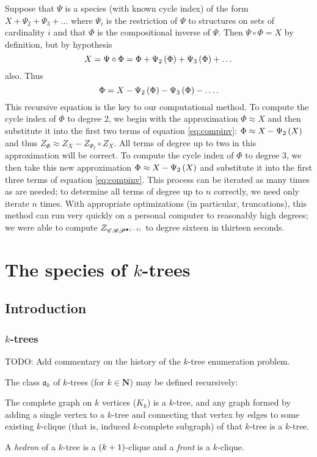 \documentclass[sectionflow,singlespace,twoside]{brandiss} %
\numberwithin{section}{chapter}
\numberwithin{figure}{chapter}
\begin{document}
Suppose that $\Psi$ is a species (with known cycle index) of the form $X + \Psi_{2} + \Psi_{3} + \dots$ where $\Psi_{i}$ is the restriction of $\Psi$ to structures on sets of cardinality $i$ and that $\Phi$ is the compositional inverse of $\Psi$.
Then $\Psi \circ \Phi = X$ by definition, but by hypothesis
\begin{equation*}
  X = \Psi \circ \Phi = \Phi + \Psi_{2} \left( {\Phi} \right) + \Psi_{3} \left( {\Phi} \right) + \dots
\end{equation*}
also. Thus
\begin{equation}
  \label{eq:compinv}
  \Phi = X - \Psi_{2} \left( {\Phi} \right) - \Psi_{3} \left( {\Phi} \right) - \dots.
\end{equation}
This recursive equation is the key to our computational method.
To compute the cycle index of $\Phi$ to degree $2$, we begin with the approximation $\Phi \approx X$ and then substitute it into the first two terms of equation \eqref{eq:compinv}: $\Phi \approx X - \Psi_{2} \left( {X} \right)$ and thus $Z_{\Phi} \approx Z_{X} - Z_{\Psi_{2}} \circ Z_{X}$.
All terms of degree up to two in this approximation will be correct.
To compute the cycle index of $\Phi$ to degree $3$, we then take this new approximation $\Phi \approx X - \Psi_{2} \left( {X} \right)$ and substitute it into the first three terms of equation \eqref{eq:compinv}.
This process can be iterated as many times as are needed; to determine all terms of degree up to $n$ correctly, we need only iterate $n$ times.
With appropriate optimizations (in particular, truncations), this method can run very quickly on a personal computer to reasonably high degrees; we were able to compute $Z_{\mathscr{CBP}^{\bullet \left\langle {-1} \right\rangle}}$ to degree sixteen in thirteen seconds.

\chapter{The species of $k$-trees}\label{c:ktrees}
\section{Introduction}\label{s:intro}
\subsection{$k$-trees}\label{ss:ktrees}
TODO: Add commentary on the history of the $k$-tree enumeration problem.

The class $\mathfrak{a}_{k}$ of $k$-trees (for $k \in \mathbf{N}$) may be defined recursively:
\begin{definition}
  \label{def:ktree}
  The complete graph on $k$ vertices ($K_{k}$) is a $k$-tree, and any graph formed by adding a single vertex to a $k$-tree and connecting that vertex by edges to some existing $k$-clique (that is, induced $k$-complete subgraph) of that $k$-tree is a $k$-tree.
\end{definition}
A \emph{hedron} of a $k$-tree is a $\left( {k+1} \right)$-clique and a \emph{front} is a $k$-clique.
\end{document}
